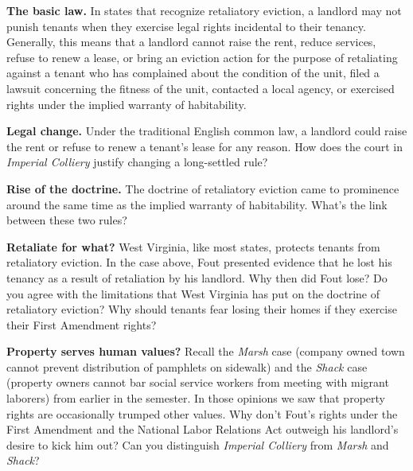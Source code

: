 
\item \textbf{The basic law.} In states that recognize retaliatory eviction, a
landlord may not punish tenants when they exercise legal rights incidental to
their tenancy.  Generally, this means that a landlord cannot raise the rent,
reduce services, refuse to renew a lease, or bring an eviction action for the
purpose of retaliating against a tenant who has complained about the condition
of the unit, filed a lawsuit concerning the fitness of the unit, contacted a
local agency, or exercised rights under the implied warranty of habitability.  


\item \textbf{Legal change.} Under the traditional English common law, a
landlord could raise the rent or refuse to renew a tenant's lease for any
reason.  How does the court in \textit{Imperial Colliery} justify changing a
long-settled rule?


\item \textbf{Rise of the doctrine.} The doctrine of retaliatory eviction came
to prominence around the same time as the implied warranty of habitability. 
What's the link between these two rules?  


\item \textbf{Retaliate for what?} West Virginia, like most states, protects
tenants from retaliatory eviction. In the case above, Fout presented evidence
that he lost his tenancy as a result of retaliation by his landlord.  Why then
did Fout lose?  Do you agree with the limitations that West Virginia has put on
the doctrine of retaliatory eviction?  Why should tenants fear losing their
homes if they exercise their First Amendment rights?


\item \textbf{Property serves human values?} Recall the \textit{Marsh} case
(company owned town cannot prevent distribution of pamphlets on sidewalk) and
the \textit{Shack} case (property owners cannot bar social service workers from
meeting with migrant laborers) from earlier in the semester.  In those opinions
we saw that property rights are occasionally trumped other values.  Why don't
Fout's rights under the First Amendment and the National Labor Relations Act
outweigh his landlord's desire to kick him out?  Can you distinguish
\textit{Imperial Colliery} from \textit{Marsh} and \textit{Shack}?  


